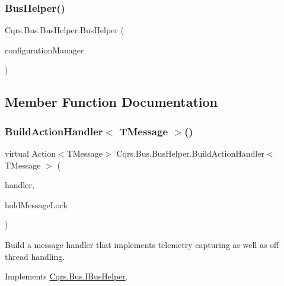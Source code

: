 \subsubsection{\texorpdfstring{Bus\+Helper()}{BusHelper()}}
{\footnotesize\ttfamily Cqrs.\+Bus.\+Bus\+Helper.\+Bus\+Helper (\begin{DoxyParamCaption}\item[{\hyperlink{interfaceCqrs_1_1Configuration_1_1IConfigurationManager}{I\+Configuration\+Manager}}]{configuration\+Manager }\end{DoxyParamCaption})}



\subsection{Member Function Documentation}
\mbox{\label{classCqrs_1_1Bus_1_1BusHelper_a6dc1f5166b7bcd13aa7a0d5e25ded295_a6dc1f5166b7bcd13aa7a0d5e25ded295}} 
\subsubsection{\texorpdfstring{Build\+Action\+Handler$<$ T\+Message $>$()}{BuildActionHandler< TMessage >()}}
{\footnotesize\ttfamily virtual Action$<$T\+Message$>$ Cqrs.\+Bus.\+Bus\+Helper.\+Build\+Action\+Handler$<$ T\+Message $>$ (\begin{DoxyParamCaption}\item[{Action$<$ T\+Message $>$}]{handler,  }\item[{bool}]{hold\+Message\+Lock }\end{DoxyParamCaption})\hspace{0.3cm}{\ttfamily [virtual]}}



Build a message handler that implements telemetry capturing as well as off thread handling. 



Implements \hyperlink{interfaceCqrs_1_1Bus_1_1IBusHelper_ac69a1e4722e2839c2c180b9a06a8646c_ac69a1e4722e2839c2c180b9a06a8646c}{Cqrs.\+Bus.\+I\+Bus\+Helper}.

